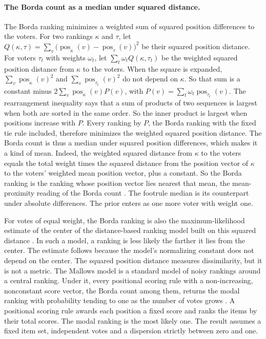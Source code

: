 \paragraph{The Borda count as a median under squared distance.} The Borda ranking minimizes a weighted sum of squared position differences to the voters. For two rankings $\kappa$ and $\tau$, let $Q(\kappa,\tau)=\sum_v\bigl(\operatorname{pos}_\kappa(v)-\operatorname{pos}_{\tau}(v)\bigr)^2$ be their squared position distance. For voters $\tau_t$ with weights $\omega_t$, let $\sum_t\omega_t Q(\kappa,\tau_t)$ be the weighted squared position distance from $\kappa$ to the voters. When the square is expanded, $\sum_v\operatorname{pos}_\kappa(v)^2$ and $\sum_v\operatorname{pos}_{\tau_t}(v)^2$ do not depend on $\kappa$. So that sum is a constant minus $2\sum_v\operatorname{pos}_\kappa(v)P(v)$, with $P(v)=\sum_t\omega_t\operatorname{pos}_{\tau_t}(v)$. The rearrangement inequality says that a sum of products of two sequences is largest when both are sorted in the same order. So the inner product is largest when positions increase with $P$. Every ranking by $P$, the Borda ranking with the fixed tie rule included, therefore minimizes the weighted squared position distance. The Borda count is thus a median under squared position differences, which makes it a kind of mean. Indeed, the weighted squared distance from $\kappa$ to the voters equals the total weight times the squared distance from the position vector of $\kappa$ to the voters' weighted mean position vector, plus a constant. So the Borda ranking is the ranking whose position vector lies nearest that mean, the mean-proximity reading of the Borda count \citep{zwicker2008average}. The footrule median is its counterpart under absolute differences. The prior enters as one more voter with weight one.

For votes of equal weight, the Borda ranking is also the maximum-likelihood estimate of the center of the distance-based ranking model built on this squared distance \citep{fligner1986distance}. In such a model, a ranking is less likely the farther it lies from the center. The estimate follows because the model's normalizing constant does not depend on the center. The squared position distance measures dissimilarity, but it is not a metric. The Mallows model is a standard model of noisy rankings around a central ranking. Under it, every positional scoring rule with a non-increasing, nonconstant score vector, the Borda count among them, returns the modal ranking with probability tending to one as the number of votes grows \citep{caragiannis2013noisy}. A positional scoring rule awards each position a fixed score and ranks the items by their total scores. The modal ranking is the most likely one. The result assumes a fixed item set, independent votes and a dispersion strictly between zero and one.

